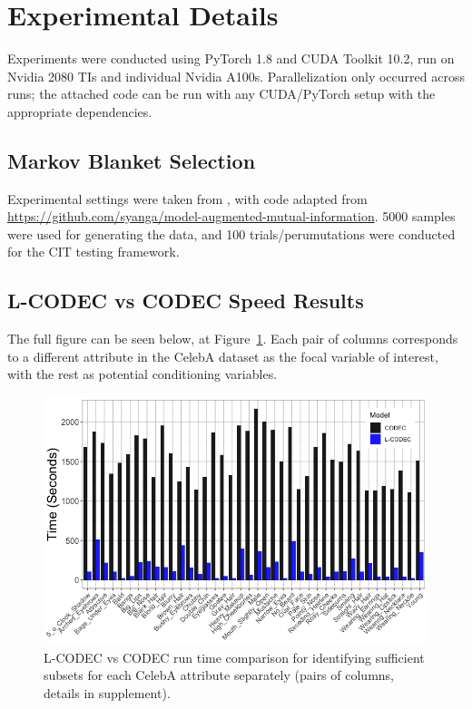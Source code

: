 \section{Experimental Details}
Experiments were conducted using PyTorch 1.8 and CUDA Toolkit 10.2, run on Nvidia 2080 TIs and individual Nvidia A100s. Parallelization only occurred across runs; the attached code can be run with any CUDA/PyTorch setup with the appropriate dependencies.

\subsection{Markov Blanket Selection}
Experimental settings were taken from \cite{bullseye}, with code adapted from  \url{https://github.com/syanga/model-augmented-mutual-information}. 5000 samples were used for generating the data, and 100 trials/perumutations were conducted for the CIT testing framework. 

\subsection{L-CODEC vs CODEC Speed Results}
The full figure can be seen below, at Figure~\ref{fig:full_speed_hist}. Each pair of columns corresponds to a different attribute in the CelebA dataset as the focal variable of interest, with the rest as potential conditioning variables.
\begin{figure}
    \centering
    \includegraphics[width=\columnwidth]{5_unlearn/figs/Speed_Hist.png}
    \caption{\label{fig:full_speed_hist} L-CODEC vs CODEC run time comparison for identifying sufficient subsets for each CelebA attribute separately (pairs of columns, details in supplement).}
\end{figure}

